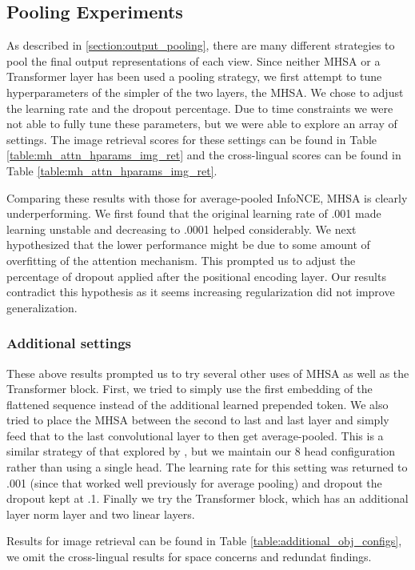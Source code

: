 \subsection{Pooling Experiments}
\label{section:pooling_experiments}



As described in \ref{section:output_pooling}, there are many different strategies to pool the final output representations of each view.
Since neither MHSA or a Transformer layer has been used a pooling strategy, we first attempt to tune hyperparameters of the simpler of the two layers, the MHSA.
We chose to adjust the learning rate and the dropout percentage.
Due to time constraints we were not able to fully tune these parameters, but we were able to explore an array of settings. 
The image retrieval scores for these settings can be found in Table \ref{table:mh_attn_hparams_img_ret} and the cross-lingual scores can be found in Table \ref{table:mh_attn_hparams_img_ret}.

Comparing these results with those for average-pooled InfoNCE, MHSA is clearly underperforming.
We first found that the original learning rate of .001 made learning unstable and decreasing to .0001 helped considerably.
We next hypothesized that the lower performance might be due to some amount of overfitting of the attention mechanism.
This prompted us to adjust the percentage of dropout applied after the positional encoding layer.
Our results contradict this hypothesis as it seems increasing regularization did not improve generalization.




\subsubsection{Additional settings}
\label{section:addition_settings}
These above results prompted us to try several other uses of MHSA as well as the Transformer block.
First, we tried to simply use the first embedding of the flattened sequence instead of the additional learned prepended token.
We also tried to place the MHSA between the second to last and last layer and simply feed that to the last convolutional layer to then get average-pooled.
This is a similar strategy of that explored by \cite{ohishi2020trilingual}, but we maintain our 8 head configuration rather than using a single head.
The learning rate for this setting was returned to .001 (since that worked well previously for average pooling) and dropout the dropout kept at .1.
Finally we try the Transformer block, which has an additional layer norm layer and two linear layers.

Results for image retrieval can be found in Table \ref{table:additional_obj_configs}, we omit the cross-lingual results for space concerns and redundat findings.

